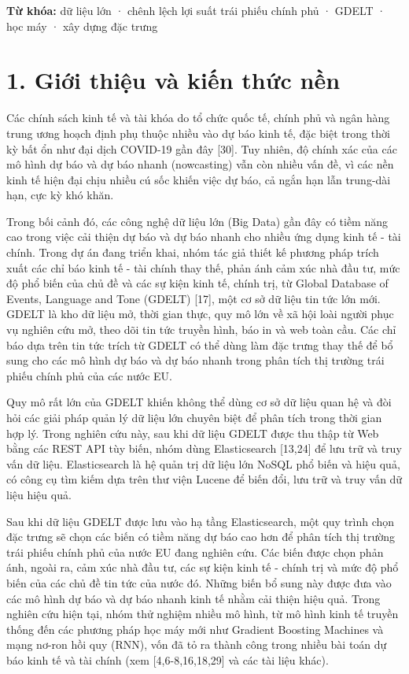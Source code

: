 \textbf{Từ khóa:} dữ liệu lớn · chênh lệch lợi suất trái phiếu chính phủ · GDELT · học máy · xây dựng đặc trưng

\section{1. Giới thiệu và kiến thức nền}

Các chính sách kinh tế và tài khóa do tổ chức quốc tế, chính phủ và ngân hàng trung ương hoạch định phụ thuộc nhiều vào dự báo kinh tế, đặc biệt trong thời kỳ bất ổn như đại dịch COVID-19 gần đây {[}30{]}. Tuy nhiên, độ chính xác của các mô hình dự báo và dự báo nhanh (nowcasting) vẫn còn nhiều vấn đề, vì các nền kinh tế hiện đại chịu nhiều cú sốc khiến việc dự báo, cả ngắn hạn lẫn trung-dài hạn, cực kỳ khó khăn.

Trong bối cảnh đó, các công nghệ dữ liệu lớn (Big Data) gần đây có tiềm năng cao trong việc cải thiện dự báo và dự báo nhanh cho nhiều ứng dụng kinh tế - tài chính. Trong dự án đang triển khai, nhóm tác giả thiết kế phương pháp trích xuất các chỉ báo kinh tế - tài chính thay thế, phản ánh cảm xúc nhà đầu tư, mức độ phổ biến của chủ đề và các sự kiện kinh tế, chính trị, từ Global Database of Events, Language and Tone (GDELT) {[}17{]}, một cơ sở dữ liệu tin tức lớn mới. GDELT là kho dữ liệu mở, thời gian thực, quy mô lớn về xã hội loài người phục vụ nghiên cứu mở, theo dõi tin tức truyền hình, báo in và web toàn cầu. Các chỉ báo dựa trên tin tức trích từ GDELT có thể dùng làm đặc trưng thay thế để bổ sung cho các mô hình dự báo và dự báo nhanh trong phân tích thị trường trái phiếu chính phủ của các nước EU.

Quy mô rất lớn của GDELT khiến không thể dùng cơ sở dữ liệu quan hệ và đòi hỏi các giải pháp quản lý dữ liệu lớn chuyên biệt để phân tích trong thời gian hợp lý. Trong nghiên cứu này, sau khi dữ liệu GDELT được thu thập từ Web bằng các REST API tùy biến, nhóm dùng Elasticsearch {[}13,24{]} để lưu trữ và truy vấn dữ liệu. Elasticsearch là hệ quản trị dữ liệu lớn NoSQL phổ biến và hiệu quả, có công cụ tìm kiếm dựa trên thư viện Lucene để biến đổi, lưu trữ và truy vấn dữ liệu hiệu quả.

Sau khi dữ liệu GDELT được lưu vào hạ tầng Elasticsearch, một quy trình chọn đặc trưng sẽ chọn các biến có tiềm năng dự báo cao hơn để phân tích thị trường trái phiếu chính phủ của nước EU đang nghiên cứu. Các biến được chọn phản ánh, ngoài ra, cảm xúc nhà đầu tư, các sự kiện kinh tế - chính trị và mức độ phổ biến của các chủ đề tin tức của nước đó. Những biến bổ sung này được đưa vào các mô hình dự báo và dự báo nhanh kinh tế nhằm cải thiện hiệu quả. Trong nghiên cứu hiện tại, nhóm thử nghiệm nhiều mô hình, từ mô hình kinh tế truyền thống đến các phương pháp học máy mới như Gradient Boosting Machines và mạng nơ-ron hồi quy (RNN), vốn đã tỏ ra thành công trong nhiều bài toán dự báo kinh tế và tài chính (xem {[}4,6-8,16,18,29{]} và các tài liệu khác).


